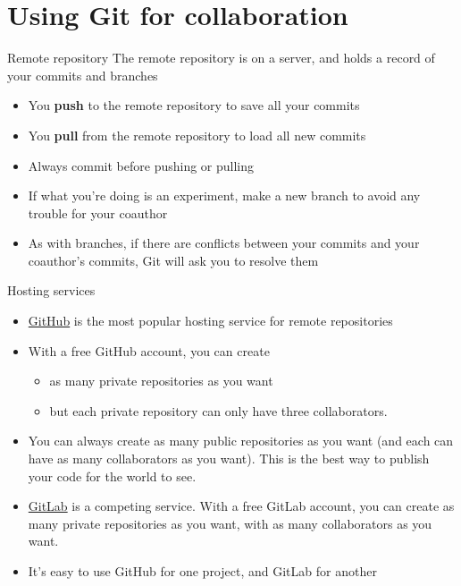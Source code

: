 \documentclass{beamer}
\begin{document}
\section{Using Git for collaboration}

\begin{frame}{Remote repository}
The remote repository is on a server, and holds a record of your commits and branches
\begin{itemize}
\item You \textbf{push} to the remote repository to save all your commits
\item You \textbf{pull} from the remote repository to load all new commits
\item Always commit before pushing or pulling
\item If what you're doing is an experiment, make a new branch to avoid any trouble for your coauthor
\item As with branches, if there are conflicts between your commits and your coauthor's commits, Git will ask you to resolve them
\end{itemize}

\end{frame}

\begin{frame}{Hosting services}
\begin{itemize}
\item \href{https://github.com/}{GitHub} is the most popular hosting service for remote repositories
\item With a free GitHub account, you can create
\begin{itemize}
\item as many private repositories as you want
\item but each private repository can only have three collaborators.
\end{itemize}
\item You can always create as many public repositories as you want (and each can have as many collaborators as you want). This is the best way to publish your code for the world to see.
\item \href{https://about.gitlab.com/}{GitLab} is a competing service. With a free GitLab account, you can create as many private repositories as you want, with as many collaborators as you want.
\item It's easy to use GitHub for one project, and GitLab for another
\end{itemize}

\end{frame}
\end{document}
